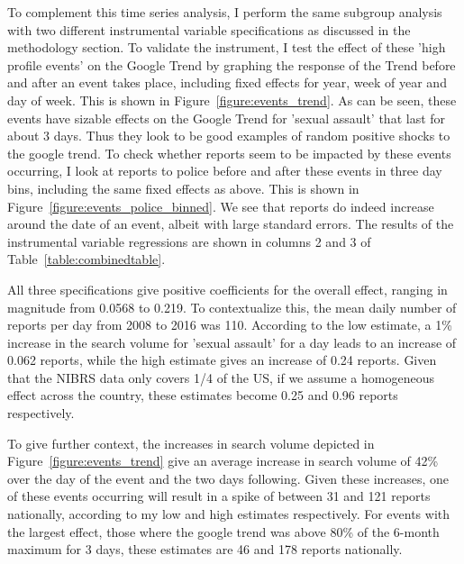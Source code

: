 \documentclass[AER,draftmode]{AEA}
\begin{document}
To complement this time series analysis, I perform the same subgroup analysis with two different instrumental variable specifications as discussed in the methodology section. To validate the instrument, I test the effect of these 'high profile events' on the Google Trend by graphing the response of the Trend before and after an event takes place, including fixed effects for year, week of year and day of week. This is shown in Figure~\ref{figure:events_trend}. As can be seen, these events have sizable effects on the Google Trend for 'sexual assault' that last for about 3 days. Thus they look to be good examples of random positive shocks to the google trend. To check whether reports seem to be impacted by these events occurring, I look at reports to police before and after these events in three day bins, including the same fixed effects as above. This is shown in Figure~\ref{figure:events_police_binned}. We see that reports do indeed increase around the date of an event, albeit with large standard errors.  The results of the instrumental variable regressions are shown in columns 2 and 3 of Table~\ref{table:combinedtable}. 

All three specifications give positive coefficients for the overall effect, ranging in magnitude from 0.0568 to 0.219. To contextualize this, the mean daily number of reports per day from 2008 to 2016 was 110. According to the low estimate, a 1\% increase in the search volume for 'sexual assault' for a day leads to an increase of 0.062 reports, while the high estimate gives an increase of 0.24 reports. Given that the NIBRS data only covers 1/4 of the US, if we assume a homogeneous effect across the country, these estimates become 0.25 and 0.96 reports respectively.

To give further context, the increases in search volume depicted in Figure~\ref{figure:events_trend} give an average increase in search volume of 42\% over the day of the event and the two days following. Given these increases, one of these events occurring will result in a spike of between 31 and 121 reports nationally, according to my low and high estimates respectively. For events with the largest effect, those where the google trend was above 80\% of the 6-month maximum for 3 days, these estimates are 46 and 178 reports nationally.
\end{document}
